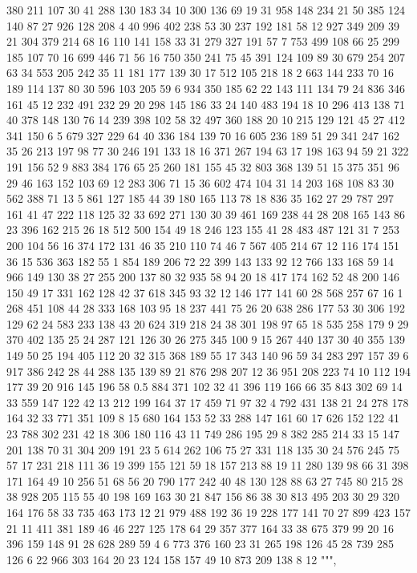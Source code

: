 \begin{pyverbatim}
{380	211	107	30	41	288	130	183	34	10	300	136	69	19	31
958	148	234	21	50	385	124	140	87	27	926	128	208	4	40
996	402	238	53	30	237	192	181	58	12	927	349	209	39	21
304	379	214	68	16	110	141	158	33	31	279	327	191	57	7
753	499	108	66	25	299	185	107	70	16	699	446	71	56	16
750	350	241	75	45	391	124	109	89	30	679	254	207	63	34
553	205	242	35	11	181	177	139	30	17	512	105	218	18	2
663	144	233	70	16	189	114	137	80	30	596	103	205	59	6
934	350	185	62	22	143	111	134	79	24	836	346	161	45	12
232	491	232	29	20	298	145	186	33	24	140	483	194	18	10
296	413	138	71	40	378	148	130	76	14	239	398	102	58	32
497	360	188	20	10	215	129	121	45	27	412	341	150	6	5
679	327	229	64	40	336	184	139	70	16	605	236	189	51	29
341	247	162	35	26	213	197	98	77	30	246	191	133	18	16
371	267	194	63	17	198	163	94	59	21	322	191	156	52	9
883	384	176	65	25	260	181	155	45	32	803	368	139	51	15
375	351	96	29	46	163	152	103	69	12	283	306	71	15	36
602	474	104	31	14	203	168	108	83	30	562	388	71	13	5
861	127	185	44	39	180	165	113	78	18	836	35	162	27	29
787	297	161	41	47	222	118	125	32	33	692	271	130	30	39
461	169	238	44	28	208	165	143	86	23	396	162	215	26	18
512	500	154	49	18	246	123	155	41	28	483	487	121	31	7
253	200	104	56	16	374	172	131	46	35	210	110	74	46	7
567	405	214	67	12	116	174	151	36	15	536	363	182	55	1
854	189	206	72	22	399	143	133	92	12	766	133	168	59	14
966	149	130	38	27	255	200	137	80	32	935	58	94	20	18
417	174	162	52	48	200	146	150	49	17	331	162	128	42	37
618	345	93	32	12	146	177	141	60	28	568	257	67	16	1
268	451	108	44	28	333	168	103	95	18	237	441	75	26	20
638	286	177	53	30	306	192	129	62	24	583	233	138	43	20
624	319	218	24	38	301	198	97	65	18	535	258	179	9	29
370	402	135	25	24	287	121	126	30	26	275	345	100	9	15
267	440	137	30	40	355	139	149	50	25	194	405	112	20	32
315	368	189	55	17	343	140	96	59	34	283	297	157	39	6
917	386	242	28	44	288	135	139	89	21	876	298	207	12	36
951	208	223	74	10	112	194	177	39	20	916	145	196	58	0.5
884	371	102	32	41	396	119	166	66	35	843	302	69	14	33
559	147	122	42	13	212	199	164	37	17	459	71	97	32	4
792	431	138	21	24	278	178	164	32	33	771	351	109	8	15
680	164	153	52	33	288	147	161	60	17	626	152	122	41	23
788	302	231	42	18	306	180	116	43	11	749	286	195	29	8
382	285	214	33	15	147	201	138	70	31	304	209	191	23	5
614	262	106	75	27	331	118	135	30	24	576	245	75	57	17
231	218	111	36	19	399	155	121	59	18	157	213	88	19	11
280	139	98	66	31	398	171	164	49	10	256	51	68	56	20
790	177	242	40	48	130	128	88	63	27	745	80	215	28	38
928	205	115	55	40	198	169	163	30	21	847	156	86	38	30
813	495	203	30	29	320	164	176	58	33	735	463	173	12	21
979	488	192	36	19	228	177	141	70	27	899	423	157	21	11
411	381	189	46	46	227	125	178	64	29	357	377	164	33	38
675	379	99	20	16	396	159	148	91	28	628	289	59	4	6
773	376	160	23	31	265	198	126	45	28	739	285	126	6	22
966	303	164	20	23	124	158	157	49	10	873	209	138	8	12
""",

}
\end{pyverbatim}
